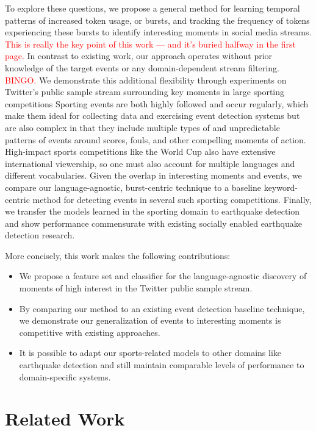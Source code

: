 \documentclass{sig-alternate}
\newcommand{\red}[1]{\textcolor{red}{#1}}
\begin{document}
To explore these questions, we propose a general method for learning temporal patterns of increased token usage, or bursts, and tracking the frequency of tokens experiencing these bursts to identify interesting moments in social media streams. 
\red{This is really the key point of this work --- and it's buried halfway in the first page.}
In contrast to existing work, our approach operates without prior knowledge of the target events or any domain-dependent stream filtering. \red{BINGO.}
We demonstrate this additional flexibility through experiments on Twitter's public sample stream surrounding key moments in large sporting competitions
Sporting events are both highly followed and occur regularly, which make them ideal for collecting data and exercising event detection systems but are also complex in that they include multiple types of and unpredictable patterns of events around scores, fouls, and other compelling moments of action.
High-impact sports competitions like the World Cup also have extensive international viewership, so one must also account for multiple languages and different vocabularies.
Given the overlap in interesting moments and events, we compare our language-agnostic, burst-centric technique to a baseline keyword-centric method for detecting events in several such sporting competitions.
Finally, we transfer the models learned in the sporting domain to earthquake detection and show performance commensurate with existing socially enabled earthquake detection research.

More concisely, this work makes the following contributions:
%
\begin{itemize}
\item We propose a feature set and classifier for the language-agnostic discovery of moments of high interest in the Twitter public sample stream.
\item By comparing our method to an existing event detection baseline technique, we demonstrate our generalization of events to interesting moments is competitive with existing approaches.
\item It is possible to adapt our sports-related models to other domains like earthquake detection and still maintain comparable levels of performance to domain-specific systems.
\end{itemize}

\section{Related Work}
\label{sect:relatedWork}
\end{document}
